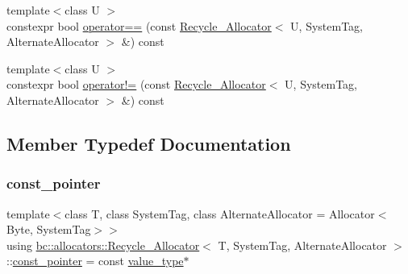 \begin{DoxyCompactItemize}
\item 
{\footnotesize template$<$class U $>$ }\\constexpr bool \hyperlink{structbc_1_1allocators_1_1Recycle__Allocator_a1f763358fde2b3f5e0a1c7ddcec4e551}{operator==} (const \hyperlink{structbc_1_1allocators_1_1Recycle__Allocator}{Recycle\+\_\+\+Allocator}$<$ U, System\+Tag, Alternate\+Allocator $>$ \&) const
\item 
{\footnotesize template$<$class U $>$ }\\constexpr bool \hyperlink{structbc_1_1allocators_1_1Recycle__Allocator_aed4267489b64420fafbe56b68f3b349b}{operator!=} (const \hyperlink{structbc_1_1allocators_1_1Recycle__Allocator}{Recycle\+\_\+\+Allocator}$<$ U, System\+Tag, Alternate\+Allocator $>$ \&) const
\end{DoxyCompactItemize}


\subsection{Member Typedef Documentation}
\mbox{\label{structbc_1_1allocators_1_1Recycle__Allocator_a6dfe2b530915023ad4fe08cc1dc9de55}} 
\subsubsection{\texorpdfstring{const\+\_\+pointer}{const\_pointer}}
{\footnotesize\ttfamily template$<$class T, class System\+Tag, class Alternate\+Allocator = Allocator$<$\+Byte, System\+Tag$>$$>$ \\
using \hyperlink{structbc_1_1allocators_1_1Recycle__Allocator}{bc\+::allocators\+::\+Recycle\+\_\+\+Allocator}$<$ T, System\+Tag, Alternate\+Allocator $>$\+::\hyperlink{structbc_1_1allocators_1_1Recycle__Allocator_a6dfe2b530915023ad4fe08cc1dc9de55}{const\+\_\+pointer} =  const \hyperlink{structbc_1_1allocators_1_1Recycle__Allocator_af461967c55249583cda104fdf7a79fc9}{value\+\_\+type}$\ast$}

\mbox{\label{structbc_1_1allocators_1_1Recycle__Allocator_a411361c7c7a3aadec6020692a32b774b}} 
